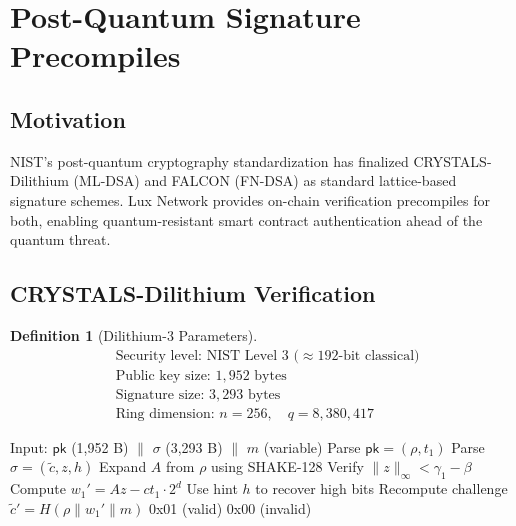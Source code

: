 \documentclass[11pt,a4paper]{article}
\newtheorem{definition}{Definition}
\begin{document}
\section{Post-Quantum Signature Precompiles}\label{sec:pq}

\subsection{Motivation}

NIST's post-quantum cryptography standardization \cite{nistpqc2024} has finalized CRYSTALS-Dilithium (ML-DSA) and FALCON (FN-DSA) as standard lattice-based signature schemes. Lux Network provides on-chain verification precompiles for both, enabling quantum-resistant smart contract authentication ahead of the quantum threat.

\subsection{CRYSTALS-Dilithium Verification}

\begin{definition}[Dilithium-3 Parameters]
\begin{align}
    &\text{Security level: NIST Level 3 ($\approx 192$-bit classical)} \\
    &\text{Public key size: } 1{,}952 \text{ bytes} \\
    &\text{Signature size: } 3{,}293 \text{ bytes} \\
    &\text{Ring dimension: } n = 256, \quad q = 8{,}380{,}417
\end{align}
\end{definition}

\begin{algorithm}[H]
\caption{Dilithium-3 Verification Precompile}
\label{alg:dilithium}
\begin{algorithmic}[1]
\Require Input: $\mathsf{pk}$ (1,952 B) $\|$ $\sigma$ (3,293 B) $\|$ $m$ (variable)
\State Parse $\mathsf{pk} = (\rho, t_1)$ 
\State Parse $\sigma = (\tilde{c}, z, h)$ 
\State Expand $A$ from $\rho$ using SHAKE-128
\State Verify $\|z\|_\infty < \gamma_1 - \beta$
\State Compute $w_1' = Az - ct_1 \cdot 2^d$
\State Use hint $h$ to recover high bits
\State Recompute challenge $\tilde{c}' = H(\rho \| w_1' \| m)$
    \State \Return 0x01 (valid)
\Else
    \State \Return 0x00 (invalid)
\EndIf
\end{algorithmic}
\end{algorithm}
\end{document}
